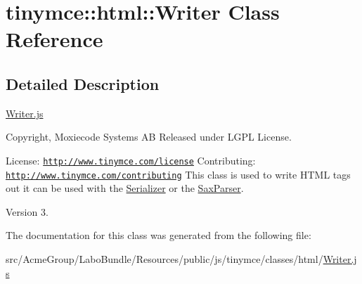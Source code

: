 \hypertarget{classtinymce_1_1html_1_1_writer}{\section{tinymce\+:\+:html\+:\+:Writer Class Reference}
\label{classtinymce_1_1html_1_1_writer}
}


\subsection{Detailed Description}
\hyperlink{_writer_8js}{Writer.\+js}

Copyright, Moxiecode Systems A\+B Released under L\+G\+P\+L License.

License\+: \href{http://www.tinymce.com/license}{\tt http\+://www.\+tinymce.\+com/license} Contributing\+: \href{http://www.tinymce.com/contributing}{\tt http\+://www.\+tinymce.\+com/contributing} This class is used to write H\+T\+M\+L tags out it can be used with the \hyperlink{classtinymce_1_1html_1_1_serializer}{Serializer} or the \hyperlink{classtinymce_1_1html_1_1_sax_parser}{Sax\+Parser}.

\begin{DoxyVersion}{Version}
3. 
\end{DoxyVersion}


The documentation for this class was generated from the following file\+:\begin{DoxyCompactItemize}
\item 
src/\+Acme\+Group/\+Labo\+Bundle/\+Resources/public/js/tinymce/classes/html/\hyperlink{_writer_8js}{Writer.\+js}\end{DoxyCompactItemize}
